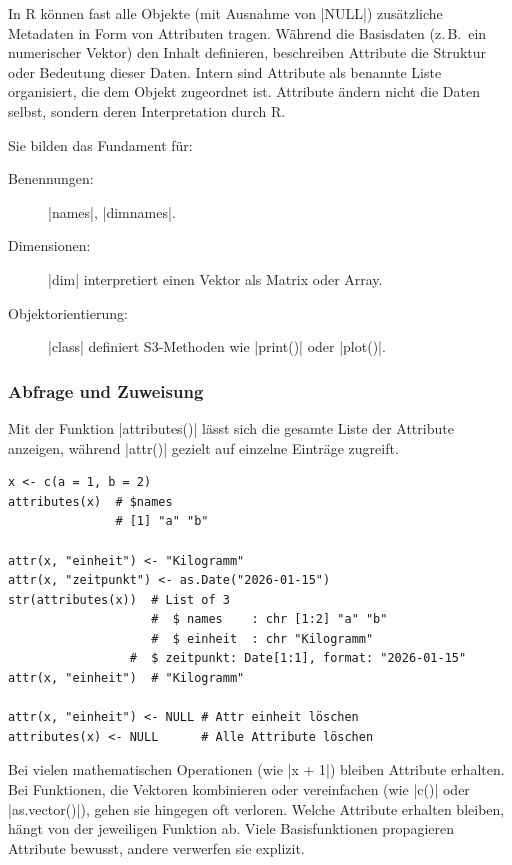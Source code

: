 \documentclass[10pt,twocolumn]{scrartcl}
\renewcommand{\lstinline}{\mycoloredinline}
\begin{document}
In R können fast alle Objekte (mit Ausnahme von \lstinline|NULL|) zusätzliche Metadaten in Form von Attributen tragen. Während die Basisdaten (z.\,B.\ ein numerischer Vektor) den Inhalt definieren, beschreiben Attribute die Struktur oder Bedeutung dieser Daten. Intern sind Attribute als benannte Liste organisiert, die dem Objekt zugeordnet ist. Attribute ändern nicht die Daten selbst, sondern deren Interpretation durch R.

Sie bilden das Fundament für:

\begin{description}
\item[Benennungen:] \lstinline|names|, \lstinline|dimnames|.
\item[Dimensionen:] \lstinline|dim| interpretiert einen Vektor als Matrix oder Array.
\item[Objektorientierung:] \lstinline|class| definiert S3-Methoden wie \lstinline|print()| oder \lstinline|plot()|.
\end{description}

\subsubsection{Abfrage und Zuweisung}

Mit der Funktion \lstinline|attributes()| lässt sich die gesamte Liste der Attribute anzeigen, während \lstinline|attr()| gezielt auf einzelne Einträge zugreift.

\begin{lstlisting}
x <- c(a = 1, b = 2)
attributes(x)  # $names
               # [1] "a" "b"

attr(x, "einheit") <- "Kilogramm"
attr(x, "zeitpunkt") <- as.Date("2026-01-15")
str(attributes(x))  # List of 3
                    #  $ names    : chr [1:2] "a" "b"
                    #  $ einheit  : chr "Kilogramm"
                 #  $ zeitpunkt: Date[1:1], format: "2026-01-15"
attr(x, "einheit")  # "Kilogramm"

attr(x, "einheit") <- NULL # Attr einheit löschen
attributes(x) <- NULL      # Alle Attribute löschen
\end{lstlisting}

Bei vielen mathematischen Operationen (wie \lstinline|x + 1|) bleiben Attribute erhalten. Bei Funktionen, die Vektoren kombinieren oder vereinfachen (wie \lstinline|c()| oder \lstinline|as.vector()|), gehen sie hingegen oft verloren. Welche Attribute erhalten bleiben, hängt von der jeweiligen Funktion ab. Viele Basisfunktionen propagieren Attribute bewusst, andere verwerfen sie explizit.
\end{document}
